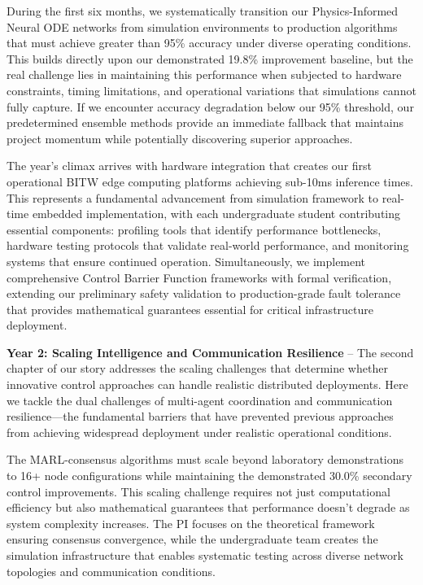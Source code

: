 \documentclass[12pt]{article}
\begin{document}
During the first six months, we systematically transition our Physics-Informed Neural ODE networks from simulation environments to production algorithms that must achieve greater than 95\% accuracy under diverse operating conditions. This builds directly upon our demonstrated 19.8\% improvement baseline, but the real challenge lies in maintaining this performance when subjected to hardware constraints, timing limitations, and operational variations that simulations cannot fully capture. If we encounter accuracy degradation below our 95\% threshold, our predetermined ensemble methods provide an immediate fallback that maintains project momentum while potentially discovering superior approaches.

The year's climax arrives with hardware integration that creates our first operational BITW edge computing platforms achieving sub-10ms inference times. This represents a fundamental advancement from simulation framework to real-time embedded implementation, with each undergraduate student contributing essential components: profiling tools that identify performance bottlenecks, hardware testing protocols that validate real-world performance, and monitoring systems that ensure continued operation. Simultaneously, we implement comprehensive Control Barrier Function frameworks with formal verification, extending our preliminary safety validation to production-grade fault tolerance that provides mathematical guarantees essential for critical infrastructure deployment.

\textbf{Year 2: Scaling Intelligence and Communication Resilience} – The second chapter of our story addresses the scaling challenges that determine whether innovative control approaches can handle realistic distributed deployments. Here we tackle the dual challenges of multi-agent coordination and communication resilience—the fundamental barriers that have prevented previous approaches from achieving widespread deployment under realistic operational conditions.

The MARL-consensus algorithms must scale beyond laboratory demonstrations to 16+ node configurations while maintaining the demonstrated 30.0\% secondary control improvements. This scaling challenge requires not just computational efficiency but also mathematical guarantees that performance doesn't degrade as system complexity increases. The PI focuses on the theoretical framework ensuring consensus convergence, while the undergraduate team creates the simulation infrastructure that enables systematic testing across diverse network topologies and communication conditions.
\end{document}
